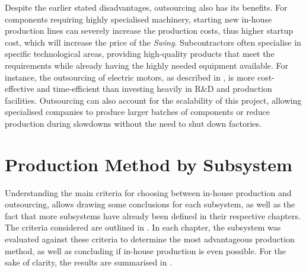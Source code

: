 Despite the earlier stated disadvantages, outsourcing also has its benefits.
For components requiring highly specialised machinery, starting new in-house production lines can severely increase the production costs, thus higher startup cost, which will increase the price of the \textit{Swing}.
Subcontractors often specialise in specific technological areas, providing high-quality products that meet the requirements while already having the highly needed equipment available.
For instance, the outsourcing of electric motors, as described in , is more cost-effective and time-efficient than investing heavily in R\&D and production facilities. 
Outsourcing can also account for the scalability of this project, allowing specialised companies to produce larger batches of components or reduce production during slowdowns without the need to shut down factories.

\section{Production Method by Subsystem}
\label{sec:prodmeth_subsys}
Understanding the main criteria for choosing between in-house production and outsourcing, allows drawing some conclusions for each subsystem, as well as the fact that more subsystems have already been defined in their respective chapters.
The criteria considered are outlined in .
In each chapter, the subsystem was evaluated against these criteria to determine the most advantageous production method, as well as concluding if in-house production is even possible.
For the sake of clarity, the results are summarised in .


